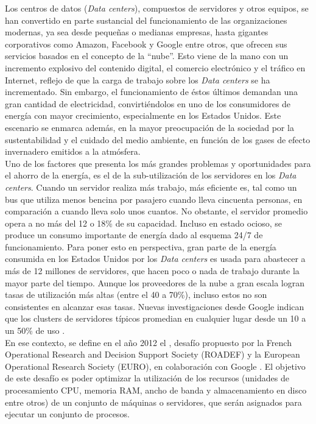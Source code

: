
Los centros de datos (\textit{Data centers}), compuestos de servidores y otros equipos, se han convertido en parte sustancial del funcionamiento de las organizaciones modernas, ya sea desde pequeñas o medianas empresas, hasta gigantes corporativos como Amazon, Facebook y Google entre otros, que ofrecen sus servicios basados en el concepto de la ``nube''. Esto viene de la mano con un incremento explosivo del contenido digital, el comercio electrónico y el tráfico en Internet, reflejo de que la carga de trabajo sobre los \textit{Data centers} se ha incrementado. Sin embargo, el funcionamiento de éstos últimos demandan una gran cantidad de electricidad, convirtiéndolos en uno de los consumidores de energía con mayor crecimiento, especialmente en los Estados Unidos. Este escenario se enmarca además, en la mayor preocupación de la sociedad por la sustentabilidad y el cuidado del medio ambiente, en función de los gases de efecto invernadero emitidos a la atmósfera. \\
Uno de los factores que presenta los más grandes problemas y oportunidades para el ahorro de la energía, es el de la sub-utilización de los servidores en los \textit{Data centers}.
Cuando un servidor realiza más trabajo, más eficiente es, tal como un bus que utiliza menos bencina por pasajero cuando lleva cincuenta personas, en comparación a cuando lleva solo unos cuantos. No obstante, el servidor promedio opera a no más del 12 o 18\% de su capacidad. Incluso en estado ocioso, se produce un consumo importante de energía dado al esquema 24/7 de funcionamiento. Para poner esto en perspectiva, gran parte de la energía consumida en los Estados Unidos por los \textit{Data centers} es usada para abastecer a más de 12 millones de servidores, que hacen poco o nada de trabajo durante la mayor parte del tiempo. Aunque los proveedores de la nube a gran escala logran tasas de utilización más altas (entre el 40 a 70\%), incluso estos no son consistentes en alcanzar esas tasas. Nuevas investigaciones desde Google indican que los clusters de servidores típicos promedian en cualquier lugar desde un 10 a un 50\% de uso \cite{DCEfficiencyAssessment}. \\
En ese contexto, se define en el año 2012  el \mrp, desafío propuesto por la French Operational Research and Decision Support Society (ROADEF) y la European Operational Research Society (EURO), en colaboración con Google \cite{2012ProblemDefinition}. El objetivo de este desafío es poder optimizar la utilización de los recursos (unidades de procesamiento CPU, memoria RAM, ancho de banda y almacenamiento en disco entre otros) de un conjunto de máquinas o servidores, que serán asignados para ejecutar un conjunto de procesos. \\

